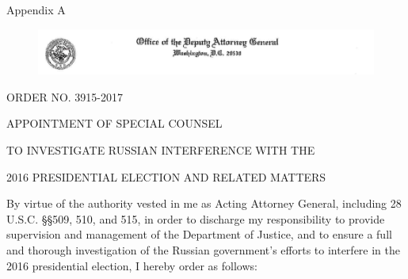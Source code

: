 
\thispagestyle{empty}

\vspace*{15em}

\begin{center}

\Huge
Appendix A

\end{center}

\newpage

\begin{figure}[ht]
    \vspace{-20pt}
    \begin{center}
        \includegraphics[width=8.25in]{images/appendix-a-header.png}%
    \end{center}
    \vspace{-20pt}
\end{figure}

\begin{center}
ORDER NO. 3915-2017

APPOINTMENT OF SPECIAL COUNSEL

TO INVESTIGATE RUSSIAN INTERFERENCE WITH THE

2016 PRESIDENTIAL ELECTION AND RELATED MATTERS
\end{center}

By virtue of the authority vested in me as Acting Attorney General, including 28 U.S.C. \S\S 509, 510, and 515, in order to discharge my responsibility to provide supervision and management of the Department of Justice, and to ensure a full and thorough investigation of the Russian government's efforts to interfere in the 2016 presidential election, I hereby order as follows:


